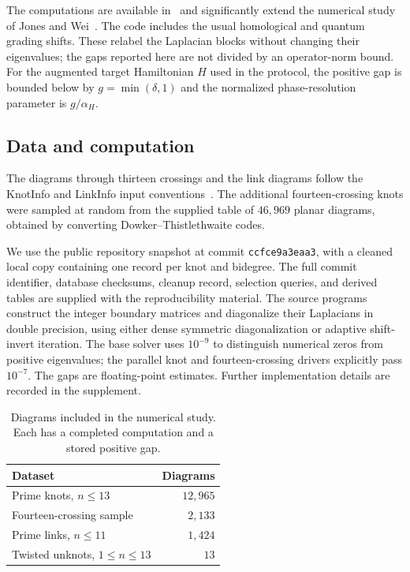 \documentclass[a4paper,onecolumn,unpublished]{quantumarticle}
\theoremstyle{plain}
\theoremstyle{definition}
\theoremstyle{definition}
\numberwithin{equation}{section}
\begin{document}
The computations are available in~\cite{hodge_khovanov_spectra} and significantly extend the
numerical study of Jones and Wei~\cite{JonesWei2025}.
The code includes the usual homological and quantum grading shifts.
These relabel the Laplacian blocks without changing their eigenvalues;
the gaps reported here are not divided by an operator-norm bound.
For the augmented target
Hamiltonian $H$ used in the protocol,
the positive gap is bounded below by $g=\min(\delta,1)$ and the normalized
phase-resolution parameter is $g/\alpha_H$.

\subsection{Data and computation}
The diagrams through thirteen crossings and the link diagrams follow the
KnotInfo and LinkInfo input conventions~\cite{Knotinfo2025,Linkinfo2025}.
The additional fourteen-crossing knots were sampled at random from the supplied
table of $46{,}969$ planar diagrams, obtained by converting
Dowker--Thistlethwaite codes. 

We use the public repository snapshot at commit
\texttt{ccfce9a3eaa3}, with a cleaned local copy containing one record per
knot and bidegree. The full commit identifier, database checksums, cleanup
record, selection queries, and derived tables are supplied with the
reproducibility material.
The source programs construct the integer boundary matrices and diagonalize
their Laplacians in double precision, using either dense symmetric
diagonalization or adaptive shift-invert iteration. The base solver uses
$10^{-9}$ to distinguish numerical zeros from positive eigenvalues;
the parallel knot and fourteen-crossing drivers explicitly pass $10^{-7}$.
The gaps are floating-point estimates. Further implementation details
are recorded in the supplement.

\begin{table}[htbp]
\centering
\begin{tabular}{lr}
\hline
Dataset & Diagrams \\
\hline
Prime knots, $n\leq13$ & $12{,}965$ \\
Fourteen-crossing sample & $2{,}133$ \\
Prime links, $n\leq11$ & $1{,}424$ \\
Twisted unknots, $1\leq n\leq13$ & $13$ \\
\hline
\end{tabular}
\caption{Diagrams included in the numerical study. Each has a completed
computation and a stored positive gap.}
\label{tab:numerical_coverage}
\end{table}
\end{document}
